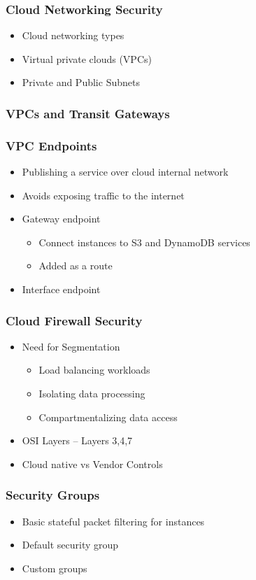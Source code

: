 		\subsubsection {Cloud Networking Security}
			\begin{itemize}
				\item Cloud networking types
				\item Virtual private clouds (VPCs)
				\item Private and Public Subnets
			\end{itemize}
		\subsubsection {VPCs and Transit Gateways}
		\subsubsection {VPC Endpoints}
			\begin{itemize}
				\item Publishing a service over cloud internal network
				\item Avoids exposing traffic to the internet
				\item Gateway endpoint
					\begin{itemize}
						\item Connect instances to S3 and DynamoDB services
						\item Added as a route
					\end{itemize}
				\item Interface endpoint
			\end{itemize}
		\subsubsection {Cloud Firewall Security}
			\begin{itemize}
				\item Need for Segmentation
					\begin{itemize}
						\item Load balancing workloads
						\item Isolating data processing
						\item Compartmentalizing data access
					\end{itemize}
				\item OSI Layers -- Layers 3,4,7
				\item Cloud native vs Vendor Controls
			\end{itemize}
		\subsubsection {Security Groups}
			\begin{itemize}
				\item Basic stateful packet filtering for instances
				\item Default security group
				\item Custom groups
			\end{itemize}
